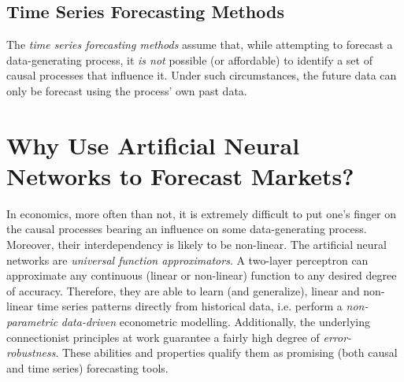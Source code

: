 \subsection{Time Series Forecasting Methods}

The \textit{time series forecasting methods} assume that, while attempting to forecast a data-generating process, it \textit{is not} possible (or affordable) to identify a set of causal processes that influence it. Under such circumstances, the future data can only be forecast using the process' own past data.

\section{Why Use Artificial Neural Networks to Forecast Markets?}

In economics, more often than not, it is extremely difficult to put one's finger on the causal processes bearing an influence on some data-generating process. Moreover, their interdependency is likely to be non-linear. The artificial neural networks are \textit{universal function approximators}. A two-layer perceptron can approximate any continuous (linear or non-linear) function to any desired degree of accuracy. Therefore, they are able to learn (and generalize), linear and non-linear time series patterns directly from historical data, i.e. perform a \textit{non-parametric} \textit{data-driven} econometric modelling. Additionally, the underlying connectionist principles at work guarantee a fairly high degree of \textit{error-robustness}. These abilities and properties qualify them as promising (both causal and time series) forecasting tools.